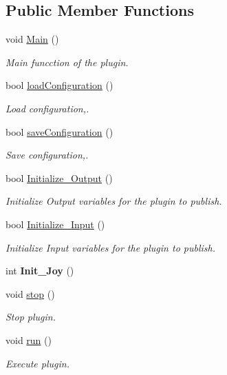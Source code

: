 \subsection*{Public Member Functions}
\begin{DoxyCompactItemize}
\item 
void \hyperlink{class_joystick___reader_a5e5233926fb917ac45131b095afecdb8}{Main} ()
\begin{DoxyCompactList}\small\item\em Main funcction of the plugin. \end{DoxyCompactList}\item 
bool \hyperlink{class_joystick___reader_a906c6bb884e18a17d22edcfebe73a4b2}{load\+Configuration} ()
\begin{DoxyCompactList}\small\item\em Load configuration,. \end{DoxyCompactList}\item 
bool \hyperlink{class_joystick___reader_a037ce3a1ee3aef5b722a768a4c1e1181}{save\+Configuration} ()
\begin{DoxyCompactList}\small\item\em Save configuration,. \end{DoxyCompactList}\item 
bool \hyperlink{class_joystick___reader_ab57adbf1ffe66ec0eaf10601253a3116}{Initialize\+\_\+\+Output} ()
\begin{DoxyCompactList}\small\item\em Initialize Output variables for the plugin to publish. \end{DoxyCompactList}\item 
bool \hyperlink{class_joystick___reader_af58a274480586227ef68dc550a0ed5fa}{Initialize\+\_\+\+Input} ()
\begin{DoxyCompactList}\small\item\em Initialize Input variables for the plugin to publish. \end{DoxyCompactList}\item 
\mbox{\label{class_joystick___reader_a5af51cd757ceae740037fb78ca93e8fe}} 
int {\bfseries Init\+\_\+\+Joy} ()
\item 
void \hyperlink{class_joystick___reader_a44c818d23aa269ed72701291ff65b4b3}{stop} ()
\begin{DoxyCompactList}\small\item\em Stop plugin. \end{DoxyCompactList}\item 
void \hyperlink{class_joystick___reader_abb81b93f1ca6f574c007a02188f6dd1e}{run} ()
\begin{DoxyCompactList}\small\item\em Execute plugin. \end{DoxyCompactList}\end{DoxyCompactItemize}
